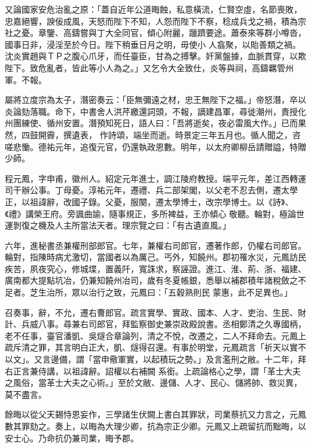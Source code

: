 \begin{pinyinscope}
 又論國家安危治亂之原：「蓋自近年公道晦蝕，私意橫流，仁賢空虛，名節喪敗，忠嘉絕響，諛佞成風，天怒而陛下不知，人怨而陛下不察，稔成兵戈之禍，積為宗社之憂。章鑒、高鑄嘗與丁大全同官，傾心附麗，躐躋要途。蕭泰來等群小噂沓，國事日非，浸淫至於今日。陛下稍垂日月之明，毋使小
 人翕聚，以貽善類之禍。沈炎實趙與ＴＰ之腹心爪牙，而任臺臣，甘為之搏擊。奸黨盤據，血脈貫穿，以欺陛下。致危亂者，皆此等小人為之。」又乞令大全致仕，炎等與祠，高鑄羈管州軍。不報。



 屬將立度宗為太子，潛密奏云：「臣無彌遠之材，忠王無陛下之福。」帝怒潛，卒以炎論劾落職。命下，中書舍人洪芹繳還詞頭，不報，謫建昌軍，尋徙潮州，責授化州團練使、循州安置。潛預知死日，語人曰：「吾將逝矣，夜必雷風大作。」已而果然，四鼓開霽，撰遺表，
 作詩頌，端坐而逝。時景定三年五月也。循人聞之，咨嗟悲慟。德祐元年，追復元官，仍還執政恩數。明年，以太府卿柳岳請贈謚，特贈少師。



 程元鳳，字申甫，徽州人。紹定元年進士，調江陵府教授。端平元年，差江西轉運司干辦公事。丁母憂。淳祐元年，遷禮、兵二部架閣，以父老不忍去側，遷太學正，以祖諱辭，改國子錄。父憂，服闋，遷太學博士，改宗學博士。以《詩》、《禮》講榮王府。旁諷曲諭，隨事規正，多所裨益，王亦傾心
 敬聽。輪對，極論世運剝復之機及人主所當法天者。理宗覽之曰：「有古遺直風。」



 六年，進秘書丞兼權刑部郎官。七年，兼權右司郎官，遷著作郎，仍權右司郎官。輪對，指陳時病尤激切，當國者以為厲己。丐外，知饒州。郡初罹水災，元鳳訪民疾苦，夙夜究心，修城堞，置義阡，寬誅求，察誣證。進江、淮、荊、浙、福建、廣南都大提點坑冶，仍兼知饒州冶司，歲有冬夏帳銀，悉舉以補郡積年諸稅斂之不足者。芝生治所，眾以治行之致，元鳳曰：「五穀熟則民
 蒙惠，此不足異也。」



 召奏事，辭，不允，遷右曹郎官。疏言實學、實政、國本、人才、吏治、生民、財計、兵威八事。尋兼右司郎官，拜監察御史兼崇政殿說書。丞相鄭清之久專國柄，老不任事，臺官潘凱、吳燧合章論列，清之不悅，改遷之，二人不拜命去。元鳳上疏斥清之罪，其言明白正大，凱、燧得召還。有事於明堂，元鳳疏言「祈天以實不以文」。又言邊備，謂「當申儆軍實，以起積玩之勢。」及言濫刑之敝。十二年，拜右正言兼侍講，以祖諱辭。詔權以右補闕
 系銜。上疏論格心之學，謂「革士大夫之風俗，當革士大夫之心術。」至於文敝、邊儲、人才、民心、儲將帥、救災異，莫不盡言。



 餘晦以從父天錫恃恩妄作，三學諸生伏闕上書白其罪狀，司業蔡抗又力言之，元鳳數其罪劾之。奏上，以晦為大理少卿，抗為宗正少卿。元鳳又上疏留抗而黜晦，以安士心。乃命抗仍兼司業，晦予郡。




\end{pinyinscope}
